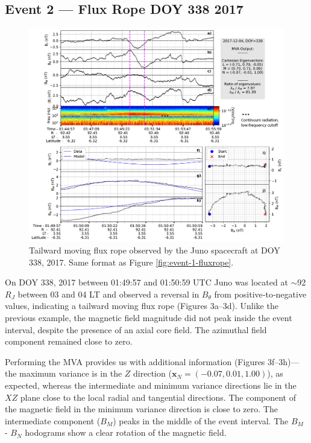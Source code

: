 \subsection{Event 2 — Flux Rope DOY 338 2017}

\begin{figure}
    \centering
    \includegraphics[width=\textwidth]{images5/event-2-fluxrope.jpg}
    \caption{Tailward moving flux rope observed by the Juno spacecraft at DOY 338, 2017. Same format as Figure \ref{fig:event-1-fluxrope}.}
    \label{fig:event-2-fluxrope}
\end{figure}

On DOY 338, 2017 between 01:49:57 and 01:50:59 UTC Juno was located at $\sim$92 $R_J$ between 03 and 04 LT and observed a reversal in $B_\theta$ from positive‐to‐negative values, indicating a tailward moving flux rope (Figures 3a–3d). Unlike the previous example, the magnetic field magnitude did not peak inside the event interval, despite the presence of an axial core field. The azimuthal field component remained close to zero.

Performing the MVA provides us with additional information (Figures 3f–3h)—the maximum variance is in the $Z$ direction ($\mathbf{x}_N=(-0.07,0.01,1.00)$), as expected, whereas the intermediate and minimum variance directions lie in the $XZ$ plane close to the local radial and tangential directions. The component of the magnetic field in the minimum variance direction is close to zero. The intermediate component ($B_M$) peaks in the middle of the event interval. The $B_M$ - $B_N$ hodograms show a clear rotation of the magnetic field.

